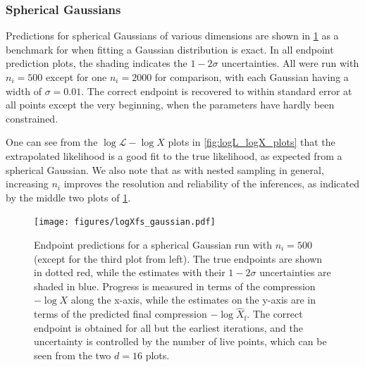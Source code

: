 \documentclass[usenatbib]{mnras}
\newcommand{\nlive}{n_i}
\newcommand{\Like}{\mathcal{L}}
\begin{document}
\subsubsection{Spherical Gaussians}
Predictions for spherical Gaussians of various dimensions are shown in \cref{fig:logXfs_gaussian} as a benchmark for when fitting a Gaussian distribution is exact. In all endpoint prediction plots, the shading indicates the $1-2\sigma$ uncertainties. All were run with $\nlive = 500$ except for one $\nlive=2000$ for comparison, with each Gaussian having a width of $\sigma = 0.01$. The correct endpoint is recovered to within standard error at all points except the very beginning, when the parameters have hardly been constrained. 
\par
One can see from the $\log\Like-\log X$ plots in \cref{fig:logL_logX_plots} that the extrapolated likelihood is a good fit to the true likelihood, as expected from a spherical Gaussian. We also note that as with nested sampling in general, increasing $\nlive$ improves the resolution and reliability of the inferences, as indicated by the middle two plots of \cref{fig:logXfs_gaussian}.
\begin{figure}
\begin{center}
    \texttt{[image: figures/logXfs\_gaussian.pdf]}
\end{center}
\caption{Endpoint predictions for a spherical Gaussian run with $\nlive=500$ (except for the third plot from left). The true endpoints are shown in dotted red, while the estimates with their $1-2\sigma$ uncertainties are shaded in blue. Progress is measured in terms of the compression $-\log X$ along the x-axis, while the estimates on the y-axis are in terms of the predicted final compression $-\log \hat{X}_\mathrm{f}$. The correct endpoint is obtained for all but the earliest iterations, and the uncertainty is controlled by the number of live points, which can be seen from the two $d = 16$ plots.}
\label{fig:logXfs_gaussian}
\end{figure}
\end{document}
